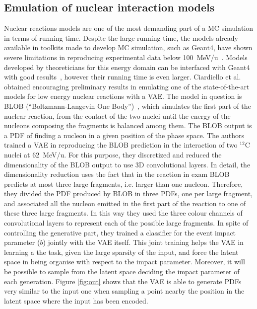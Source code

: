 \subsection{Emulation of nuclear interaction models}
Nuclear reactions models are one of the most demanding part of a MC simulation in terms of running time. Despite the large running time, the models already available in toolkits made to develop MC simulation, such as Geant4, have shown severe limitations in reproducing experimental data below 100~MeV/u~\cite{Arce2021}. Models developed by theoreticians for this energy domain can be interfaced with Geant4 with good results~\cite{Mancini-Terracciano2019}, however their running time is even larger. Ciardiello et al.~\cite{Ciardiello2020} obtained encouraging preliminary results 
in emulating one of the state-of-the-art models for low energy nuclear reactions with a VAE. The model in question is BLOB (``Boltzmann-Langevin One Body'')~\cite{Napolitani2013}, which simulates the first part of the nuclear reaction, from the contact of the two nuclei until the energy of the nucleons composing the fragments is balanced among them. The BLOB output is a PDF of finding a nucleon in a given position of the phase space. The authors trained a VAE in reproducing the BLOB prediction in the interaction of two $^{12}$C nuclei at 62~MeV/u. For this purpose, they discretized and reduced the dimensionality of the BLOB output to use 3D convolutional layers. In detail, the dimensionality reduction uses the fact that in the reaction in exam BLOB predicts at most three large fragments, i.e. larger than one nucleon. Therefore, they divided the PDF produced by BLOB in three PDFs, one per large fragment, and associated all the nucleon emitted in the first part of the reaction to one of these three large fragments. In this way they used the three colour channels of convolutional layers to represent each of the possible large fragments. In spite of controlling the generative part, they trained a classifier for the event impact parameter ($b$) jointly with the VAE itself. This joint training helps the VAE in learning a the task, given the large sparsity of the input, and force the latent space in being organise with respect to the impact parameter. Moreover, it will be possible to sample from the latent space deciding the impact parameter of each generation.
Figure \ref{fig:out} shows that the VAE is able to generate PDFs very similar to the input one when sampling a point nearby the position in the latent space where the input has been encoded.

